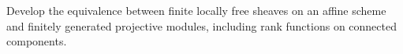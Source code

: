 \begin{problem}
Develop the equivalence between finite locally free sheaves on an affine scheme and finitely generated projective modules, including rank functions on connected components.
\end{problem}
